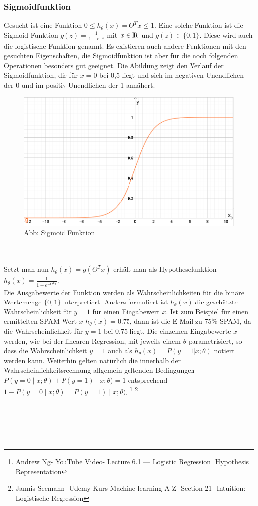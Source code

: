 \documentclass[a4paper]{scrreprt}
\begin{document}
\subsubsection{Sigmoidfunktion}
Gesucht ist eine Funktion $0 \leq h_{\theta}(x)=\Theta^Tx \leq 1$. Eine solche Funktion ist die Sigmoid-Funktion $g(z)=\frac{1}{1+e^{-z}}$ mit $x \in \rm I\!R$ und $g(z) \in \{0,1\}$. Diese wird auch die logistische Funktion genannt. Es existieren auch andere Funktionen mit den gesuchten Eigenschaften, die Sigmoidfunktion ist aber für die noch folgenden Operationen besonders gut geeignet. Die Abildung zeigt den Verlauf der Sigmoidfunktion, die für $x=0$ bei 0,5 liegt und sich im negativen Unendlichen der 0 und im positiv Unendlichen der 1 annähert.\\
%
\begin{figure}[h]
\centering
\includegraphics[scale=.74]{Abbildungen/Logistische_Regression_1}
\caption{Abb: Sigmoid Funktion}
\label{figure}
\end{figure}
\\\\
Setzt man nun $h_\theta(x)=g(\Theta^Tx)$ erhält man als Hypothesefunktion $h_{\theta}(x)=\frac{1}{1+e^{-\Theta^Tx}}$.\\ 
Die Ausgabewerte der Funktion werden als Wahrscheinlichkeiten für die binäre Wertemenge $\{0,1\}$ interpretiert. Anders formuliert ist $h_{\theta}(x)$ die geschätzte Wahrscheinlichkeit für $y=1$ für einen Eingabewert $x$. Ist zum Beispiel für einen ermittelten SPAM-Wert $x$ $h_{\theta}(x)=0.75$, dann ist die E-Mail zu 75\% SPAM, da die Wahrscheinlichkeit für $y=1$ bei 0.75 liegt. Die einzelnen Eingabewerte $x$ werden, wie bei der linearen Regression, mit jeweils einem $\theta$ parametrisiert, so dass die Wahrscheinlichkeit $y=1$ auch als $h_{\theta}(x)=P(y=1|x;\theta)$ notiert werden kann. Weiterhin gelten natürlich die innerhalb der Wahrscheinlichkeitsrechnung allgemein geltenden Bedingungen $P(y=0\mid x;\theta)+ P(y=1)\mid x;\theta)=1$ entsprechend $1-P(y=0\mid x;\theta)=P(y=1)\mid x;\theta)$.
\footnote{Andrew Ng- YouTube Video- Lecture 6.1 — Logistic Regression |Hypothesis Representation}
\footnote{Jannis Seemann- Udemy Kurs Machine learning A-Z- Section 21- Intuition: Logistische Regression}
\par\bigskip
\\\\
\\\\
\end{document}
